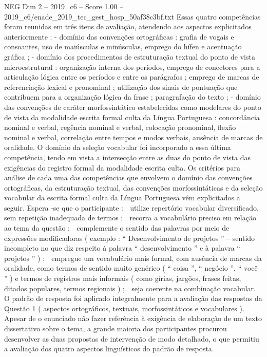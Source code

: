 \begin{textsample}{NEG Dim 2 – 2019\_c6 – Score 1.00 – 2019\_c6/enade\_2019\_tec\_gest\_hosp\_50af38c3bf.txt}
Essas quatro competências foram reunidas em três itens de avaliação, atendendo aos aspectos explicitados anteriormente : - domínio das convenções ortográficas : grafia de vogais e consoantes, uso de maiúsculas e minúsculas, emprego do hífen e acentuação gráfica ; - domínio dos procedimentos de estruturação textual do ponto de vista microestrutural : organização interna dos períodos, emprego de conectores para a articulação lógica entre os períodos e entre os parágrafos ; emprego de marcas de referenciação lexical e pronominal ; utilização dos sinais de pontuação que contribuem para a organização lógica da frase ; paragrafação do texto ; - domínio das convenções de caráter morfossintático estabelecidas como modelares do ponto de vista da modalidade escrita formal culta da Língua Portuguesa : concordância nominal e verbal, regência nominal e verbal, colocação pronominal, flexão nominal e verbal, correlação entre tempos e modos verbais, ausência de marcas de oralidade.
O domínio da seleção vocabular foi incorporado a essa última competência, tendo em vista a intersecção entre as duas do ponto de vista das exigências do registro formal da modalidade escrita culta.
Os critérios para análise de cada uma das competências que envolvem o domínio das convenções ortográficas, da estruturação textual, das convenções morfossintáticas e da seleção vocabular da escrita formal culta da Língua Portuguesa vêm explicitados a seguir.
Espera -se que o participante :  utilize repertório vocabular diversificado, sem repetição inadequada de termos ;  recorra a vocabulário preciso em relação ao tema da questão ;  complemente o sentido das palavras por meio de expressões modificadoras ( exemplo : “ Desenvolvimento de projetos ” – sentido incompleto no que diz respeito à palavra “ desenvolvimento ” e à palavra “ projetos ” ) ;  empregue um vocabulário mais formal, com ausência de marcas da oralidade, como termos de sentido muito genérico ( “ coisa ”, “ negócio ”, “ você ” ) e termos de registros mais informais ( como gírias, jargões, frases feitas, ditados populares, termos regionais ) ;  seja coerente na combinação vocabular.
O padrão de resposta foi aplicado integralmente para a avaliação das respostas da Questão 1 ( aspectos ortográficos, textuais, morfossintáticos e vocabulares ).
Apesar de o enunciado não fazer referência à exigência de elaboração de um texto dissertativo sobre o tema, a grande maioria dos participantes procurou desenvolver as duas propostas de intervenção de modo detalhado, o que permitiu a avaliação dos quatro aspectos linguísticos do padrão de resposta.

\end{textsample}
